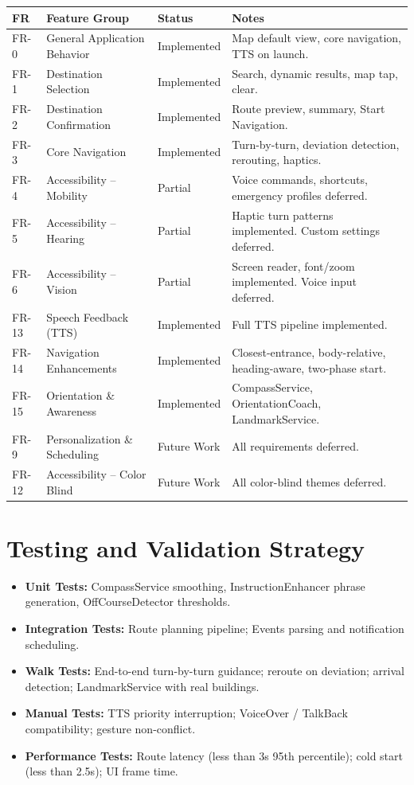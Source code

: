 \documentclass[12pt]{article}
\begin{document}
\begin{tabularx}{\textwidth}{|l|l|l|X|}
\hline
\textbf{FR} & \textbf{Feature Group} & \textbf{Status} & \textbf{Notes} \\
\hline
FR-0 & General Application Behavior & Implemented & Map default view, core navigation, TTS on launch. \\
\hline
FR-1 & Destination Selection & Implemented & Search, dynamic results, map tap, clear. \\
\hline
FR-2 & Destination Confirmation & Implemented & Route preview, summary, Start Navigation. \\
\hline
FR-3 & Core Navigation & Implemented & Turn-by-turn, deviation detection, rerouting, haptics. \\
\hline
FR-4 & Accessibility -- Mobility & Partial & Voice commands, shortcuts, emergency profiles deferred. \\
\hline
FR-5 & Accessibility -- Hearing & Partial & Haptic turn patterns implemented. Custom settings deferred. \\
\hline
FR-6 & Accessibility -- Vision & Partial & Screen reader, font/zoom implemented. Voice input deferred. \\
\hline
FR-13 & Speech Feedback (TTS) & Implemented & Full TTS pipeline implemented. \\
\hline
FR-14 & Navigation Enhancements & Implemented & Closest-entrance, body-relative, heading-aware, two-phase start. \\
\hline
FR-15 & Orientation \& Awareness & Implemented & CompassService, OrientationCoach, LandmarkService. \\
\hline
FR-9 & Personalization \& Scheduling & Future Work & All requirements deferred. \\
\hline
FR-12 & Accessibility -- Color Blind & Future Work & All color-blind themes deferred. \\
\hline
\end{tabularx}

\section{Testing and Validation Strategy}

\begin{itemize}
    \item \textbf{Unit Tests:} CompassService smoothing, InstructionEnhancer phrase generation, OffCourseDetector thresholds.
    \item \textbf{Integration Tests:} Route planning pipeline; Events parsing and notification scheduling.
    \item \textbf{Walk Tests:} End-to-end turn-by-turn guidance; reroute on deviation; arrival detection; LandmarkService with real buildings.
    \item \textbf{Manual Tests:} TTS priority interruption; VoiceOver / TalkBack compatibility; gesture non-conflict.
    \item \textbf{Performance Tests:} Route latency (less than 3s 95th percentile); cold start (less than 2.5s); UI frame time.
\end{itemize}
\end{document}
